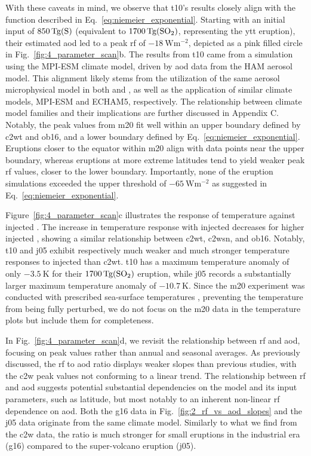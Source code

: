\documentclass{ametsocV6.1}
\newcommand{\iso}[1][i]{{#1}njected \ce{SO2}}
\begin{document}
With these caveats in mind, we observe that \gls{t10}'s results closely align with the
function described in Eq.~\ref{eq:niemeier_exponential}. Starting with an initial input
of \(\SI{850}{\tera\gram(\ce{S})}\) (equivalent to \(\SI{1700}{\tera\gram(\ce{SO2})}\),
representing the \gls{ytt} eruption), their estimated \gls{aod} led to a peak \gls{rf}
of \(\SI{-18}{\watt\meter^{-2}}\), depicted as a pink filled circle in
Fig.~\ref{fig:4_parameter_scan}b. The results from \gls{t10} came from a simulation
using the MPI-ESM climate model, driven by \gls{aod} data from the HAM aerosol model.
This alignment likely stems from the utilization of the same aerosol microphysical model
in both \citet{timmreck2010} and \citet{niemeier2015}, as well as the application of
similar climate models, MPI-ESM and ECHAM5, respectively. The relationship between
climate model families and their implications are further discussed in Appendix C.
Notably, the peak values from \gls{m20} fit well within an upper boundary defined by
\gls{c2wt} and \gls{ob16}, and a lower boundary defined by
Eq.~\ref{eq:niemeier_exponential}. Eruptions closer to the equator within \gls{m20}
align with data points near the upper boundary, whereas eruptions at more extreme
latitudes tend to yield weaker peak \gls{rf} values, closer to the lower boundary.
Importantly, none of the eruption simulations exceeded the upper threshold of
\(\SI{-65}{\watt\meter^{-2}}\) as suggested in Eq.~\ref{eq:niemeier_exponential}.

Figure~\ref{fig:4_parameter_scan}c illustrates the response of temperature against
\iso{}. The increase in temperature response with \iso{} decreases for higher \iso{},
showing a similar relationship between \gls{c2wt}, \gls{c2wsn}, and \gls{ob16}. Notably,
\gls{t10} and \gls{j05} exhibit respectively much weaker and much stronger temperature
responses to \iso{} than \gls{c2wt}. \gls{t10} has a maximum temperature anomaly of only
\(\SI{-3.5}{\kelvin}\) for their \(\SI{1700}{\tera\gram(\ce{SO2})}\) eruption, while
\gls{j05} records a substantially larger maximum temperature anomaly of
\(\SI{-10.7}{\kelvin}\). Since the \gls{m20} experiment was conducted with prescribed
sea-surface temperatures \citep{marshall2020}, preventing the temperature from being
fully perturbed, we do not focus on the \gls{m20} data in the temperature plots but
include them for completeness.

In Fig.~\ref{fig:4_parameter_scan}d, we revisit the relationship between \gls{rf} and
\gls{aod}, focusing on peak values rather than annual and seasonal averages. As
previously discussed, the \gls{rf} to \gls{aod} ratio displays weaker slopes than
previous studies, with the \gls{c2w} peak values not conforming to a linear trend. The
relationship between \gls{rf} and \gls{aod} suggests potential substantial dependencies
on the model and its input parameters, such as latitude, but most notably to an inherent
non-linear \gls{rf} dependence on \gls{aod}. Both the \gls{g16} data in
Fig.~\ref{fig:2_rf_vs_aod_slopes} and the \gls{j05} data originate from the same climate
model. Similarly to what we find from the \gls{c2w} data, the ratio is much stronger for
small eruptions in the industrial era (\gls{g16}) compared to the super-volcano eruption
(\gls{j05}).
\end{document}
